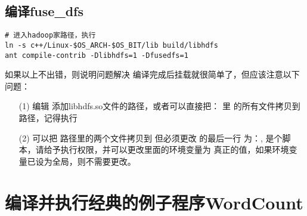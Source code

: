 \documentclass{article}
\begin{document}
\subsection{编译fuse\_dfs}
\begin{verbatim}
# 进入hadoop家路径，执行
ln -s c++/Linux-$OS_ARCH-$OS_BIT/lib build/libhdfs 
ant compile-contrib -Dlibhdfs=1 -Dfusedfs=1 
\end{verbatim}

\textsf{如果以上不出错，则说明问题解决}
编译完成后挂载就很简单了，但应该注意以下问题：
\begin{itemize}
\item[(1)] 编辑 添加libhdfs.so文件的路径，或者可以直接把： 里
的所有文件拷贝到路径，记得执行
\item[(2)] 可以把 路径里的两个文件拷贝到 但必须更改
的最后一行 为：,  是个脚本，请给予执行权限，并可以更改里面的环境变量为
真正的值，如果环境变量已设为全局，则不需要更改。
\end{itemize}


\section{编译并执行经典的例子程序WordCount}
\end{document}
